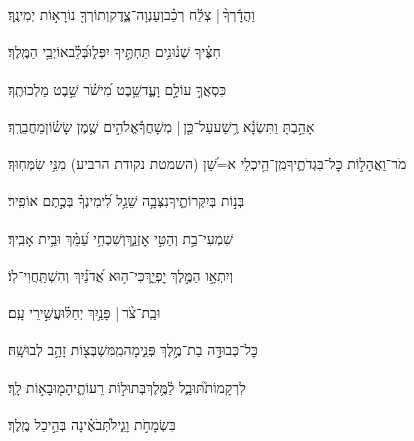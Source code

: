 \documentclass[12pt]{article}
\newcommand{\loc}[1]{\textsuperscript{\locf{#1}}}
\begin{document}
{\loc{ ה}~}‏וַהֲדָ֬רְךָ֨ |  צְלַ֬ח רְכַ֗ב{\hfill}\newline\hspace*{.5em}וְעַנְוָה־צֶ֑דֶק{\hfill}וְתוֹרְךָ֖ נוֹרָא֣וֹת יְמִינֶֽךָ׃\par

{\loc{ ו}~}‏חִצֶּ֗יךָ שְׁנ֫וּנִ֥ים{\hfill} תַּחְתֶּ֣יךָ יִפְּל֑וּ\newline\hspace*{.5em}בְּ֝לֵ֗ב{\hfill}אוֹיְבֵ֥י הַמֶּֽלֶךְ׃\par

{\loc{ ז}~}‏כִּסְאֲךָ֣  עוֹלָ֣ם וָעֶ֑ד{\hfill}שֵׁ֥בֶט מִ֝ישֹׁ֗ר שֵׁ֣בֶט מַלְכוּתֶֽךָ׃\par

{\loc{ ח}~}‏אָהַ֣בְתָּ  וַתִּשְׂנָ֫א רֶ֥שַׁע{\hfill}עַל־כֵּ֤ן |  מְשָׁחֲךָ֡\newline\hspace*{.5em}אֱלֹהִ֣ים  שֶׁ֥מֶן שָׂשׂ֗וֹן{\hfill}מֵחֲבֵרֶֽךָ׃\par

{\loc{ ט}~}‏מֹר־וַאֲהָל֣וֹת  כׇּל־בִּגְדֹתֶ֑יךָ{\hfill}מִֽן־הֵ֥יכְלֵי א=שֵׁ֝ן (השמטת נקודת הרביע) מִנִּ֥י שִׂמְּחֽוּךָ׃\par

{\loc{ י}~}‏בְּנ֣וֹת  בְּיִקְּרוֹתֶ֑יךָ{\hfill}נִצְּבָ֥ה שֵׁגַ֥ל לִ֝ימִינְךָ֗ בְּכֶ֣תֶם אוֹפִֽיר׃\par

{\loc{ יא}~}‏שִׁמְעִי־בַ֣ת  וְהַטִּ֣י אׇזְנֵ֑ךְ{\hfill}וְשִׁכְחִ֥י עַ֝מֵּ֗ךְ וּבֵ֥ית אָבִֽיךְ׃\par

{\loc{ יב}~}‏וְיִתְאָ֣ו הַמֶּ֣לֶךְ יׇפְיֵ֑ךְ{\hfill}כִּי־ה֥וּא אֲ֝דֹנַ֗יִךְ וְהִשְׁתַּֽחֲוִי־לֽוֹ׃\par

{\loc{ יג}~}‏וּבַֽת־צֹ֨ר | {\hfill}\newline\hspace*{.5em}פָּנַ֥יִךְ יְחַלּ֗וּ{\hfill}עֲשִׁ֣ירֵי עָֽם׃\par

{\loc{ יד}~}‏כׇּל־כְּבוּדָּ֣ה בַת־מֶ֣לֶךְ פְּנִ֑ימָה{\hfill}מִֽמִּשְׁבְּצ֖וֹת זָהָ֣ב לְבוּשָֽׁהּ׃\par

{\loc{ טו}~}‏לִרְקָמוֹת֮{\hfill}תּוּבַ֢ל לַ֫מֶּ֥לֶךְ\newline\hspace*{.5em}בְּתוּל֣וֹת  רֵעוֹתֶ֑יהָ{\hfill}מ֖וּבָא֣וֹת לָֽךְ׃\par

{\loc{ טז}~}‏ בִּשְׂמָחֹ֣ת וָגִ֑יל{\hfill}תְּ֝בֹאֶ֗ינָה בְּהֵ֣יכַל מֶֽלֶךְ׃\par
\end{document}
